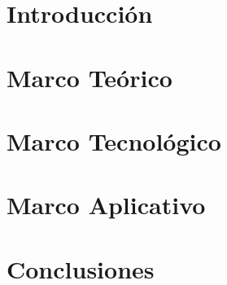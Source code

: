 \documentclass[12pt]{report}
\begin{document}
\chapter{Introducción}


\chapter{Marco Teórico}


\chapter{Marco Tecnológico}


\chapter{Marco Aplicativo}


\chapter{Conclusiones}


\clearpage

\printbibliography
\end{document}
